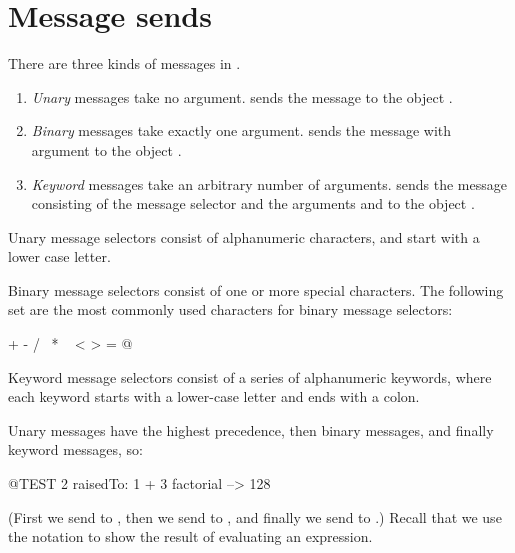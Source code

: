 \documentclass[a4paper,10pt,twoside]{book}
\begin{document}
\section{Message sends}

There are three kinds of messages in \sq.
\begin{enumerate}
  \item \emph{Unary} messages take no argument.
   sends the message  to the object .
  \item \emph{Binary} messages take exactly one argument.
  	 sends the message \ct{+} with argument  to the object .
  \item \emph{Keyword} messages take an arbitrary number of arguments.
  	 sends the message consisting of the message selector
	 and the arguments  and  to the object .
\end{enumerate}

Unary message selectors consist of alphanumeric characters, and start with a lower case letter.

Binary message selectors consist of one or more special characters. The following set are the most commonly used characters for binary message selectors:
\begin{code}{}
+ - / \ * ~ < > = @ %
\end{code}
\noindent
Keyword message selectors consist of a series of alphanumeric keywords, where each keyword starts with a lower-case letter and ends with a colon.

Unary messages have the highest precedence, then binary messages, and finally keyword messages, so:
\begin{code}{@TEST}
2 raisedTo: 1 + 3 factorial --> 128
\end{code}
(First we send  to , then we send  to , and finally we send  to .)  
Recall that we use the notation \ct{-->} to show the result of evaluating an expression.
\end{document}
